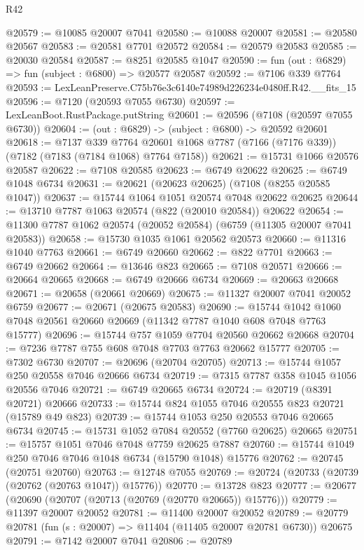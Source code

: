 \begin{lexlean}{R42}
\begin{coremodule}
{@20579 := @10085 @20007 @7041
@20580 := @10088 @20007
@20581 := @20580 @20567
@20583 := @20581 @7701 @20572
@20584 := @20579 @20583
@20585 := @20030 @20584
@20587 := @8251 @20585 @1047
@20590 := fun (out : @6829) => fun (subject : @6800) => @20577 @20587
@20592 := @7106 @339 @7764
@20593 := LexLeanPreserve.C75b76e3c6140e74989d226234e0480ff.R42.__fits_15
@20596 := @7120 (@20593 @7055 @6730)
@20597 := LexLeanBoot.RustPackage.putString
@20601 := @20596 (@7108 (@20597 @7055 @6730))
@20604 := (out : @6829) -> (subject : @6800) -> @20592 @20601
@20618 := @7137
    @339
    @7764
    @20601
    @1068
    @7787
    (@7166 (@7176 @339))
    (@7182 (@7183 (@7184 @1068) @7764 @7158))
@20621 := @15731 @1066 @20576 @20587
@20622 := @7108 @20585
@20623 := @6749 @20622
@20625 := @6749 @1048 @6734
@20631 := @20621 (@20623 @20625) (@7108 (@8255 @20585 @1047))
@20637 := @15744 @1064 @1051 @20574 @7048 @20622 @20625
@20644 := @13710 @7787 @1063 @20574 (@822 (@20010 @20584)) @20622
@20654 := @11300 @7787 @1062 @20574 (@20052 @20584) (@6759 (@11305 @20007 @7041 @20583))
@20658 := @15730 @1035 @1061 @20562 @20573
@20660 := @11316 @1040 @7763
@20661 := @6749 @20660
@20662 := @822 @7701
@20663 := @6749 @20662
@20664 := @13646 @823
@20665 := @7108 @20571
@20666 := @20664 @20665
@20668 := @6749 @20666 @6734
@20669 := @20663 @20668
@20671 := @20658 (@20661 @20669)
@20675 := @11327 @20007 @7041 @20052 @6759
@20677 := @20671 (@20675 @20583)
@20690 := @15744 @1042 @1060 @7048 @20561 @20660 @20669 (@11342 @7787 @1040 @608 @7048 @7763 @15777)
@20696 := @15744 @757 @1059 @7704 @20560 @20662 @20668
@20704 := @7236 @7787 @755 @608 @7048 @7703 @7763 @20662 @15777
@20705 := @7302 @6730
@20707 := @20696 (@20704 @20705)
@20713 := @15744 @1057 @250 @20558 @7046 @20666 @6734
@20719 := @7315 @7787 @358 @1045 @1056 @20556 @7046
@20721 := @6749 @20665 @6734
@20724 := @20719 (@8391 @20721) @20666
@20733 := @15744 @824 @1055 @7046 @20555 @823 @20721 (@15789 @49 @823)
@20739 := @15744 @1053 @250 @20553 @7046 @20665 @6734
@20745 := @15731 @1052 @7084 @20552 (@7760 @20625) @20665
@20751 := @15757 @1051 @7046 @7048 @7759 @20625 @7887
@20760 := @15744 @1049 @250 @7046 @7046 @1048 @6734 (@15790 @1048) @15776
@20762 := @20745 (@20751 @20760)
@20763 := @12748 @7055
@20769 := @20724 (@20733 (@20739 (@20762 (@20763 @1047)) @15776))
@20770 := @13728 @823
@20777 := @20677 (@20690 (@20707 (@20713 (@20769 (@20770 @20665)) @15776)))
@20779 := @11397 @20007 @20052
@20781 := @11400 @20007 @20052
@20789 := @20779 @20781 (fun (s : @20007) => @11404 (@11405 @20007 @20781 @6730)) @20675
@20791 := @7142 @20007 @7041
@20806 := @20789
}
\end{coremodule}
\end{lexlean}
